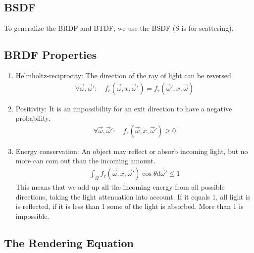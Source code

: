 \documentclass[10pt]{armath}
\numberwithin{equation}{section}
\newenvironment{Figure}
{\par\medskip\noindent\minipage{\linewidth}}
{\endminipage\par\medskip}
\theoremstyle{definition}
\begin{document}
\begin{multicols}{2}
\begin{Figure}
  \begin{center}
    
  \end{center}
  \label{fig:03_3}
\end{Figure}

\subsection{BSDF}%
\label{sub:bsdf}

To generalize the BRDF and BTDF, we use the BSDF (S is for scattering).

\subsection{BRDF Properties}%
\label{sub:brdf_properties}

\begin{enumerate}
  \item Helmholtz-reciprocity: The direction of the ray of light can be
    reversed
    \begin{align*}
      \forall\vec{\omega},\vec{\omega}':\quad
      f_r\left(\vec{\omega},x,\vec{\omega}'\right)=f_r\left(\vec{\omega}',x,\vec{\omega}\right)
    \end{align*}
  \item Positivity: It is an impossibility for an exit direction to have a
    negative probability.
    \begin{align*}
      \forall\vec{\omega},\vec{\omega}':\quad
      f_r\left(\vec{\omega},x,\vec{\omega}'\right)\geq 0
    \end{align*}
  \item Energy conservation: An object may reflect or absorb incoming light,
    but no more can com out than the incoming amount.
    \begin{align*}
      \int_\Omega
      f_r\left(\vec{\omega},x,\vec{\omega}'\right)\cos\theta d\vec{\omega}'\leq
      1
    \end{align*}
    This means that we add up all the incoming energy from all possible
    directions, taking the light attenuation into account. If it equals 1, all
    light is is reflected, if it is less than 1 some of the light is absorbed.
    More than 1 is impossible.
\end{enumerate}

\subsection{The Rendering Equation}%
\label{sub:the_rendering_equation}


\end{multicols}
\end{document}
